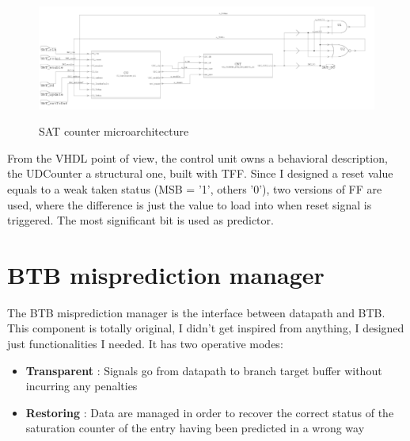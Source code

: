 \begin{figure}[H]
\centering
\includegraphics[scale=.6]{Immagini/17}
\label{17}
\caption{SAT counter microarchitecture}
\end{figure}

From the VHDL point of view, the control unit owns a behavioral description, the UDCounter a structural one, built with TFF. Since I designed a reset value equals to a weak taken status (MSB = '1', others '0'), two versions of FF are used, where the difference is just the value to load into when reset signal is triggered.\newline
The most significant bit is used as predictor. 


\section{BTB misprediction manager}
The BTB misprediction manager is the interface between datapath and BTB. This component is totally original, I didn't get inspired from anything, I designed just functionalities I needed. \newline
It has two operative modes:
\begin{itemize}
\item \textbf{Transparent} : Signals go from datapath to branch target buffer without incurring any penalties
\item \textbf{Restoring} : Data are managed in order to recover the correct status of the saturation counter of the entry having been predicted in a wrong way
\end{itemize}

